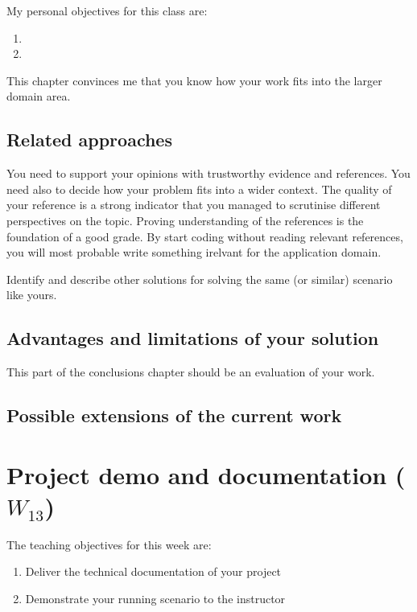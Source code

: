 \documentclass[a4paper,12pt]{report}
\begin{document}
\vspace{0.5cm}

My personal objectives for this class are:
\begin{enumerate}
 \item 
 \item 
\end{enumerate}


This chapter convinces me that you know how your work fits into the larger domain area.



\section{Related approaches}
You need to support your opinions with trustworthy evidence and references.
You need also to decide how your problem fits into a wider context.
The quality of your reference is a strong indicator that you 
managed to scrutinise different perspectives on the topic.
Proving understanding of the references is the foundation of a good grade. 
By start coding without reading relevant references, you will most probable write something irelvant for the application domain.  

Identify and describe other solutions for solving the same (or similar) scenario like yours.

\section{Advantages and limitations of your solution}
This part of the conclusions chapter should be an evaluation of your work. 


\section{Possible extensions of the current work}






\chapter{Project demo and documentation ($W_{13}$)}

The teaching objectives for this week are:
\begin{enumerate}
\item Deliver the technical documentation of your project
\item Demonstrate your running scenario to the instructor
\end{enumerate}
\end{document}
